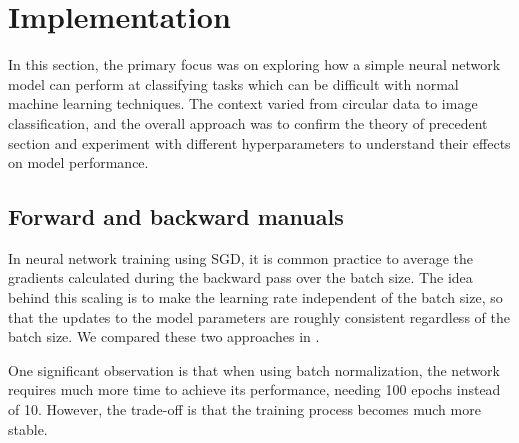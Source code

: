 \section{Implementation}

In this section, the primary focus was on exploring how a simple neural network model can perform at classifying tasks which can be difficult with normal machine learning techniques. The context varied from circular data to image classification, and the overall approach was to confirm the theory of precedent section and experiment with different hyperparameters to understand their effects on model performance.

\subsection{Forward and backward manuals}
In neural network training using SGD, it is common practice to average the gradients calculated during the backward pass over the batch size. The idea behind this scaling is to make the learning rate independent of the batch size, so that the updates to the model parameters are roughly consistent regardless of the batch size. We compared these two approaches in .

One significant observation is that when using batch normalization, the network requires much more time to achieve its performance, needing 100 epochs instead of 10. However, the trade-off is that the training process becomes much more stable.


